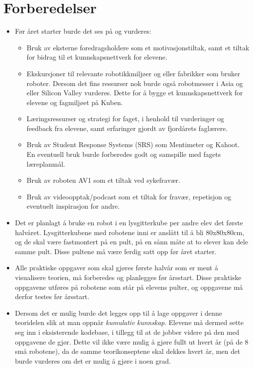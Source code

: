 \section{Forberedelser} \label{Sec: Forb}


    \begin{itemize}

        \item Før året starter burde det ses på og vurderes:

            \begin{itemize}
                \item Bruk av eksterne foredragsholdere som et motivasjonstiltak, samt et tiltak for bidrag til et kunnskapsnettverk for elevene.
                \item Ekskursjoner til relevante robotikkmiljøer og eller fabrikker som bruker roboter. Dersom det fins ressurser nok burde også robotmesser i Asia og eller Silicon Valley vurderes. Dette for å bygge et kunnskapsnettverk for elevene og fagmiljøet på Kuben.
                \item Læringsressurser og strategi for faget, i henhold til vurderinger og feedback fra elevene, samt erfaringer gjordt av fjordårets faglærere.
                \item Bruk av Student Response Systems (SRS) som Mentimeter og Kahoot. En eventuell bruk burde forberedes godt og samspille med fagets læreplanmål.
                \item Bruk av roboten AV1 som et tiltak ved sykefravær.
                \item Bruk av videoopptak/podcast som et tiltak for fravær, repetisjon og eventuelt inspirasjon for andre.
            \end{itemize}


        \item Det er planlagt å bruke en robot i en lysgitterkube per andre elev det første halvåret. Lysgitterkubene med robotene inni er anslått til å bli 80x80x80cm, og de skal være fastmontert på en pult, på en sånn måte at to elever kan dele samme pult. Disse pultene må være ferdig satt opp før året starter.

        \item Alle praktiske oppgaver som skal gjøres første halvår som er ment å visualisere teorien, må forberedes og planlegges før årsstart. Disse praktiske oppgavene utføres på robotene som står på elevens pulter, og oppgavene må derfor testes før årsstart.

        \item Dersom det er mulig burde det legges opp til å lage oppgaver i denne teoridelen slik at man oppnår \emph{kumulativ kunnskap}. Elevene må dermed sette seg inn i eksisterende kodebase, i tillegg til at de jobber videre på den med oppgavene de gjør. Dette vil ikke være mulig å gjøre fullt ut hvert år (på de 8 små robotene), da de samme teorikonseptene skal dekkes hvert år, men det burde vurderes om det er mulig å gjøre i noen grad.


\end{itemize}

